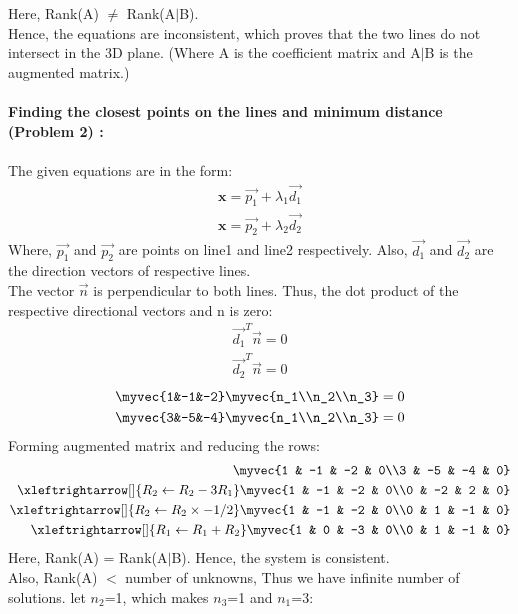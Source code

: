 \documentclass[journal,12pt,twocolumn]{IEEEtran}
\begin{document}
Here, Rank(A) $\neq$ Rank(A$\mid$B).
\\
Hence, the equations are inconsistent, which proves that the two lines do not intersect in the 3D plane. (Where A is the coefficient matrix and A$\mid$B is the augmented matrix.) \\
\\
\noindent
\textbf{Finding the closest points on the lines and minimum distance (Problem 2) :}\\
\\
The given equations are in the form:
\begin{align}
    \textbf{x}=\vec{p_1} + \lambda_1\vec{d_1}\\
    \textbf{x}=\vec{p_2} + \lambda_2\vec{d_2}
\end{align}
Where, $\vec{p_1}$ and $\vec{p_2}$ are points on line1 and line2 respectively. Also, $\vec{d_1}$ and $\vec{d_2}$ are the direction vectors of respective lines.
\\
The vector $\vec{n}$ is perpendicular to both lines. Thus, the dot product of the respective directional vectors and n is zero:
\begin{align}
    \vec{d_1}^T\vec{n} =  0\\
    \vec{d_2}^T\vec{n} =  0
\end{align}
\begin{align}
    \myvec{1&-1&-2}\myvec{n_1\\n_2\\n_3}=0\\
    \myvec{3&-5&-4}\myvec{n_1\\n_2\\n_3}=0
\end{align}
Forming augmented matrix and reducing the rows:
\begin{align}
\myvec{1 & -1 & -2 & 0\\3 & -5 & -4 & 0}\\
\xleftrightarrow[]{R_2\leftarrow R_2-3R_1}
\myvec{1 & -1 & -2 & 0\\0 & -2 & 2 & 0}\\
\xleftrightarrow[]{R_2\leftarrow R_2\times-1/2}
\myvec{1 & -1 & -2 & 0\\0 & 1 & -1 & 0}\\
\xleftrightarrow[]{R_1\leftarrow R_1+R_2}
\myvec{1 & 0 & -3 & 0\\0 & 1 & -1 & 0}
\end{align} 
Here, Rank(A) = Rank(A$\mid$B). Hence, the system is consistent. 
\\
Also, Rank(A) $<$ number of unknowns, Thus we have infinite number of solutions. let $n_2$=1, which makes $n_3$=1 and $n_1$=3:
\end{document}
